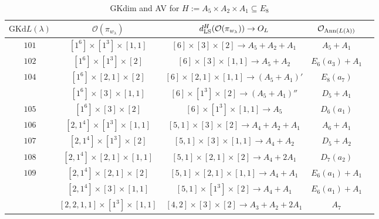 \documentclass[reqno,12pt]{amsart}
\numberwithin{equation}{section}
\theoremstyle{plain}
\theoremstyle{definition}
\newcommand{\lam}{\lambda}
\renewcommand{\subset}{\subseteq}
\begin{document}
\begin{table}[htbp]\caption{ GKdim and AV for $H:=A_5\times A_2\times A_1\subset E_8$}
	\label{taba5a2a1}
	\centering
	\renewcommand{\arraystretch}{1.5}
	\setlength\tabcolsep{5pt}
	
\footnotesize{	\begin{tabular}{|c|c|c|c|c|}
		\hline $\mathrm{GKd} L(\lambda)$ &   $\mathcal{O}({\pi_{w_{\lam}}})$& $d_{\rm LS}^{H}(\mathcal{O}(\pi_{w_\lambda}))\rightarrow    O_{L}$ & $\mathcal{O}_{{\rm Ann}(L(\lambda))}$ \\ \hline
		 $ 101 $    &  $ [1^6]\times [1^3]\times [1,1] $  &  $ [6]\times [3]\times [2] \rightarrow A_5+A_2+A_1$     &   $ A_5+A_1$      \\ \hline
		$ 102$    &  $ [1^6]\times [1^3]\times [2] $  &$[6]\times [3]\times [1,1]\rightarrow      A_5+A_2 $  &   $E_6(a_3)+A_1 $        \\ \hline

$ 104$    &  $ [1^6]\times [2,1]\times [2] $  &$[6]\times [2,1]\times [1,1]\rightarrow      (A_5+A_1)' $  &   $E_8(a_7) $        \\ 
&  $ [1^6]\times [3]\times [1,1] $  &$[6]\times [1^3]\times [2]\rightarrow      (A_5+A_1)'' $ &   $D_5+A_1$        \\
\hline
$ 105$    &  $ [1^6]\times [3]\times [2] $  &$[6]\times [1^3]\times [1,1]\rightarrow      A_5$  &   $D_6(a_1)$        \\ \hline

$ 106$    &  $ [2,1^4]\times [1^3]\times [1,1] $  &$[5,1]\times [3]\times [2]\rightarrow      A_4+A_2 +A_1$  &   $A_6+A_1 $        \\ \hline

$ 107$    &  $ [2,1^4]\times [1^3]\times [2] $  &$[5,1]\times [3]\times [1,1]\rightarrow      A_4+A_2 $  &   $D_5+A_2 $  \\ \hline

  $ 108$    &  $ [2,1^4]\times [2,1]\times [1,1] $  &$[5,1]\times [2,1]\times [2]\rightarrow      A_4+2A_1 $  &   $D_7(a_2) $  \\ \hline

$ 109$    &  $ [2,1^4]\times [2,1]\times [2] $  &$[5,1]\times [2,1]\times [1,1]\rightarrow      A_4+A_1 $  &   $E_6(a_1)+A_1 $  \\ 
&  $ [2,1^4]\times [3]\times [1,1] $  &$[5,1]\times [1^3]\times [2]\rightarrow      A_4+A_1 $  &   $E_6(a_1)+A_1 $  \\
&  $ [2,2,1,1]\times [1^3]\times [1,1] $  &$[4,2]\times [3]\times [2]\rightarrow      A_3+A_2+2A_1 $  &   $A_7 $  \\
\hline


\end{tabular}}
\end{table}
\end{document}
